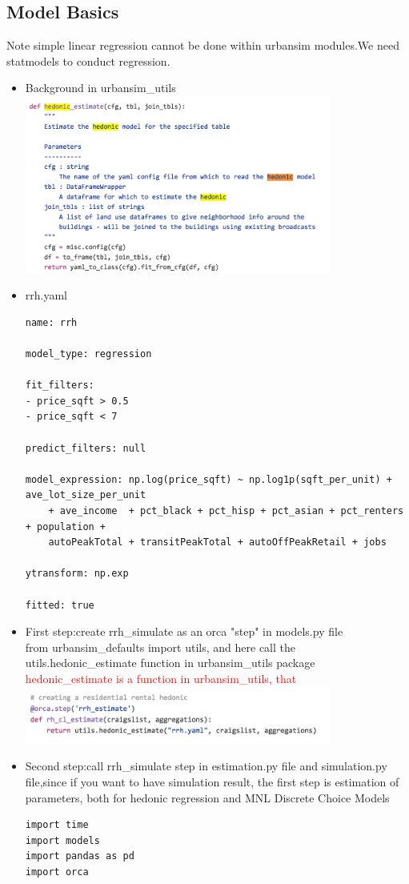 \documentclass{article}\usepackage[]{graphicx}\usepackage[]{color}
\newcommand{\red}[1]{\textcolor{red}{#1}}
\newcommand{\red}[1]{\textcolor{red}{#1}}
\begin{document}
\subsection{Model Basics}
Note simple linear regression cannot be done within urbansim modules.We need statmodels to conduct regression.\\

\begin{itemize}
\item{Background in urbansim\_utils}\\
\includegraphics[width=10cm]{2.png}
\item{rrh.yaml}\\

\begin{lstlisting}
name: rrh

model_type: regression

fit_filters:
- price_sqft > 0.5
- price_sqft < 7

predict_filters: null

model_expression: np.log(price_sqft) ~ np.log1p(sqft_per_unit) + ave_lot_size_per_unit
    + ave_income  + pct_black + pct_hisp + pct_asian + pct_renters + population +
    autoPeakTotal + transitPeakTotal + autoOffPeakRetail + jobs

ytransform: np.exp

fitted: true
\end{lstlisting}

\item{First step:create rrh\_simulate as an orca "step" in models.py file}\\
from urbansim\_defaults import utils, and here call the utils.hedonic\_estimate function in urbansim\_utils package\\
\red{hedonic\_estimate is a function in urbansim\_utils, that }\\
\includegraphics[width=10cm]{1.png}
\item{Second step:call rrh\_simulate step in estimation.py file and simulation.py file,since if you want to have simulation result, the first step is estimation of parameters, both for hedonic regression and MNL Discrete Choice Models}\\
\begin{lstlisting}
import time
import models
import pandas as pd
import orca


\end{lstlisting}
\end{itemize}
\end{document}
